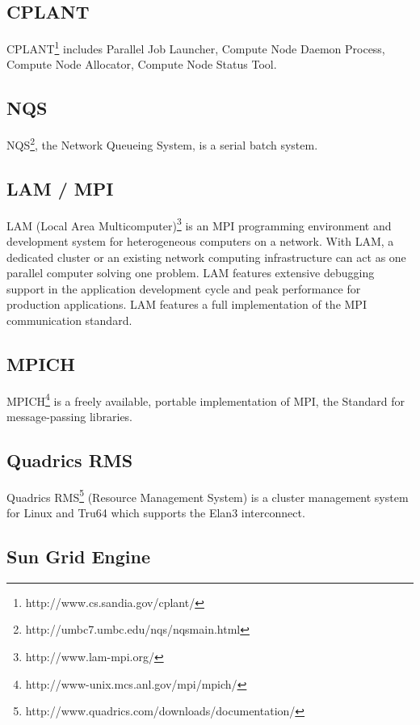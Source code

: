 \subsection{CPLANT}

CPLANT\footnote{http://www.cs.sandia.gov/cplant/} includes
Parallel Job Launcher, Compute Node Daemon Process,
Compute Node Allocator, Compute Node Status Tool.

\subsection{NQS} 

NQS\footnote{http://umbc7.umbc.edu/nqs/nqsmain.html}, 
the Network Queueing System, is a serial batch system.

\subsection{LAM / MPI}

LAM (Local Area Multicomputer)\footnote{http://www.lam-mpi.org/}
is an MPI programming environment and development system for heterogeneous 
computers on a network. 
With LAM, a dedicated cluster or an existing network
computing infrastructure can act as one parallel computer solving
one problem.  LAM features extensive debugging support in the
application development cycle and peak performance for production
applications. LAM features a full implementation of the MPI
communication standard.

\subsection{MPICH}

MPICH\footnote{http://www-unix.mcs.anl.gov/mpi/mpich/}
is a freely available, portable implementation of MPI,
the Standard for message-passing libraries.

\subsection{Quadrics RMS}

Quadrics
RMS\footnote{http://www.quadrics.com/downloads/documentation/}
(Resource Management System) is a cluster management system for 
Linux and Tru64 which supports the
Elan3 interconnect.  

\subsection{Sun Grid Engine}

